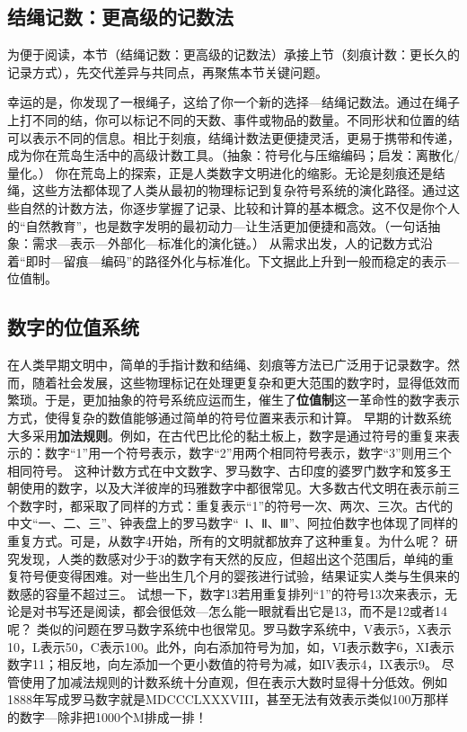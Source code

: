 \subsection{结绳记数：更高级的记数法}


为便于阅读，本节（结绳记数：更高级的记数法）承接上节（刻痕计数：更长久的记录方式），先交代差异与共同点，再聚焦本节关键问题。

幸运的是，你发现了一根绳子，这给了你一个新的选择---结绳记数法。通过在绳子上打不同的结，你可以标记不同的天数、事件或物品的数量。不同形状和位置的结可以表示不同的信息。相比于刻痕，结绳计数法更便捷灵活，更易于携带和传递，成为你在荒岛生活中的高级计数工具。{（抽象：符号化与压缩编码；启发：离散化/量化。）}
你在荒岛上的探索，正是人类数字文明进化的缩影。无论是刻痕还是结绳，这些方法都体现了人类从最初的物理标记到复杂符号系统的演化路径。通过这些自然的计数方法，你逐步掌握了记录、比较和计算的基本概念。这不仅是你个人的“自然教育”，也是数字发明的最初动力---让生活更加便捷和高效。{（一句话抽象：需求—表示—外部化—标准化的演化链。）}
从需求出发，人的记数方式沿着“即时—留痕—编码”的路径外化与标准化。下文据此上升到一般而稳定的表示---位值制。
\subsection{数字的位值系统}


在人类早期文明中，简单的手指计数和结绳、刻痕等方法已广泛用于记录数字。然而，随着社会发展，这些物理标记在处理更复杂和更大范围的数字时，显得低效而繁琐。于是，更加抽象的符号系统应运而生，催生了{\bf 位值制}这一革命性的数字表示方式，使得复杂的数值能够通过简单的符号位置来表示和计算。
早期的计数系统大多采用{\bf 加法规则}。例如，在古代巴比伦的黏土板上，数字是通过符号的重复来表示的：数字“1”用一个符号表示，数字“2”用两个相同符号表示，数字“3”则用三个相同符号。
这种计数方式在中文数字、罗马数字、古印度的婆罗门数字和笈多王朝使用的数字，以及大洋彼岸的玛雅数字中都很常见。大多数古代文明在表示前三个数字时，都采取了同样的方式：重复表示“1”的符号一次、两次、三次。古代的中文“一、二、三”、钟表盘上的罗马数字“~Ⅰ、Ⅱ、Ⅲ”、阿拉伯数字也体现了同样的重复方式。可是，从数字4开始，所有的文明就都放弃了这种重复。为什么呢？
研究发现，人类的数感对少于3的数字有天然的反应，但超出这个范围后，单纯的重复符号便变得困难。对一些出生几个月的婴孩进行试验，结果证实人类与生俱来的数感的容量不超过三。
试想一下，数字13若用重复排列“1”的符号13次来表示，无论是对书写还是阅读，都会很低效---怎么能一眼就看出它是13，而不是12或者14呢？
类似的问题在罗马数字系统中也很常见。罗马数字系统中，V表示5，X表示10，L表示50，C表示100。此外，向右添加符号为加，如，VI表示数字6，XI表示数字11；相反地，向左添加一个更小数值的符号为减，如IV表示4，IX表示9。
尽管使用了加减法规则的计数系统十分直观，但在表示大数时显得十分低效。例如1888年写成罗马数字就是MDCCCLXXXVIII，甚至无法有效表示类似100万那样的数字---除非把1000个M排成一排！

